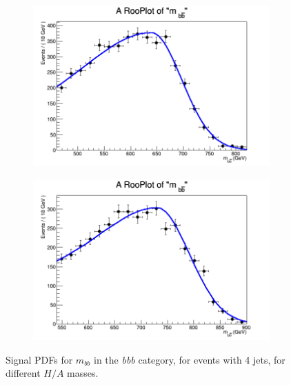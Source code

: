 \begin{figure}[phtb!]
\begin{center}
  \begin{subfigure}[$m_{A}=700$ GeV]{0.4\textwidth}\includegraphics[width=\textwidth]{FitResults/images/fitMC_bAbb700_2.png}\end{subfigure}
  \begin{subfigure}[$m_{A}=800$ GeV]{0.4\textwidth}\includegraphics[width=\textwidth]{FitResults/images/fitMC_bAbb800_2.png}\end{subfigure}
  \caption{Signal PDFs for $m_{bb}$ in the {\it bbb} category, for events with 4 jets, for different $H/A$ masses. \label{fig:signalPDFs_4j}}
    \end{center}
\end{figure}


